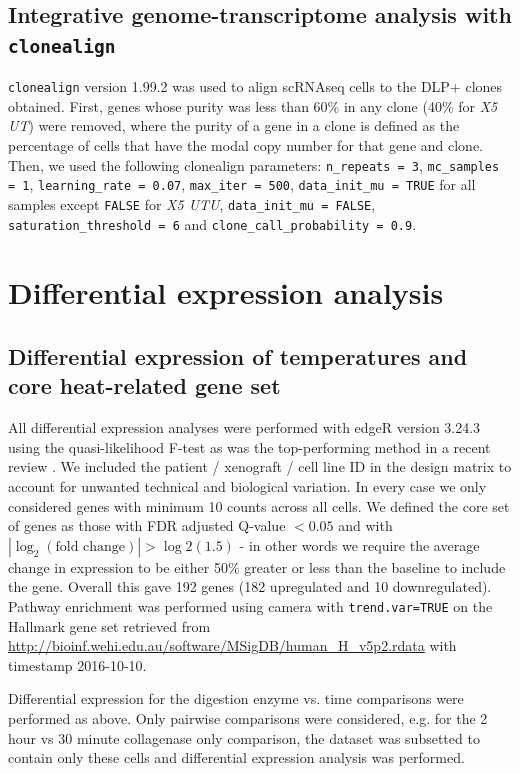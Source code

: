 \subsection{Integrative genome-transcriptome analysis with \texttt{clonealign}}
\texttt{clonealign} version 1.99.2 was used to align scRNAseq cells to the DLP+ clones obtained. First, genes whose purity was less than 60\% in any clone (40\% for \textit{X5 UT}) were removed, where the purity of a gene in a clone  is defined as the percentage of cells that have the modal copy number for that gene and clone. Then, we used the following clonealign parameters: \texttt{n\_repeats = 3}, \texttt{mc\_samples = 1}, \texttt{learning\_rate = 0.07}, \texttt{max\_iter = 500}, \texttt{data\_init\_mu = TRUE} for all samples except \texttt{FALSE} for \textit{X5 UTU}, \texttt{data\_init\_mu = FALSE},
\texttt{saturation\_threshold = 6} and \texttt{clone\_call\_probability = 0.9}.

\section{Differential expression analysis}

\subsection{Differential expression of temperatures and core heat-related gene set} 

All differential expression analyses were performed with edgeR \cite{robinson2010edger} version 3.24.3 using the quasi-likelihood F-test as was the top-performing method in a recent review \cite{soneson2018bias}. We included the patient / xenograft / cell line ID in the design matrix to account for unwanted technical and biological variation. In every case we only considered genes with minimum 10 counts across all cells.
We defined the core set of genes as those with FDR adjusted Q-value $<0.05$ and with $|\log_2(\text{fold change})| > \log2(1.5)$ - in other words we require the average change in expression to be either 50\% greater or less than the baseline to include the gene. Overall this gave 192 genes (182 upregulated and 10 downregulated).
Pathway enrichment was performed using camera \cite{wu2012camera} with \texttt{trend.var=TRUE} on the Hallmark gene set \cite{liberzon2015molecular} retrieved from \url{http://bioinf.wehi.edu.au/software/MSigDB/human\_H\_v5p2.rdata} with timestamp 2016-10-10.

Differential expression for the digestion enzyme vs. time comparisons were performed as above. Only pairwise comparisons were considered, e.g. for the 2 hour vs 30 minute collagenase only comparison, the dataset was subsetted to contain only these cells and differential expression analysis was performed.

